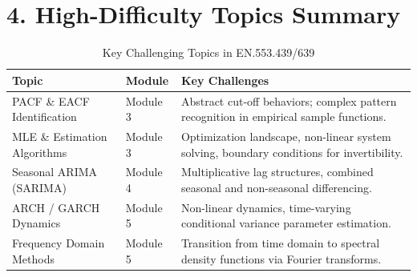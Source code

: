 \documentclass{article}
\begin{document}
\section*{4. High-Difficulty Topics Summary}
\begin{table}[h!]
\centering
\begin{tabular}{@{}llp{8cm}@{}}
\toprule
\textbf{Topic} & \textbf{Module} & \textbf{Key Challenges} \\ \midrule
PACF \& EACF Identification & Module 3 & Abstract cut-off behaviors; complex pattern recognition in empirical sample functions. \\
MLE \& Estimation Algorithms & Module 3 & Optimization landscape, non-linear system solving, boundary conditions for invertibility. \\
Seasonal ARIMA (SARIMA) & Module 4 & Multiplicative lag structures, combined seasonal and non-seasonal differencing. \\
ARCH / GARCH Dynamics & Module 5 & Non-linear dynamics, time-varying conditional variance parameter estimation. \\
Frequency Domain Methods & Module 5 & Transition from time domain to spectral density functions via Fourier transforms. \\ \bottomrule
\end{tabular}
\caption{Key Challenging Topics in EN.553.439/639}
\end{table}
\end{document}
